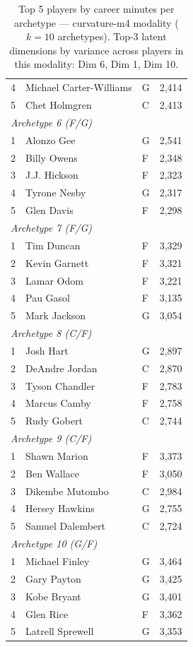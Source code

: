 \begin{table}[htbp]
\begin{tabular}{rlll}
    4 & Michael Carter-Williams & G & 2,414 \\
    5 & Chet Holmgren & C & 2,413 \\
    \midrule[0.4pt]
    \multicolumn{4}{l}{\textit{Archetype 6 (F/G)}} \\
    \midrule
    1 & Alonzo Gee & G & 2,541 \\
    2 & Billy Owens & F & 2,348 \\
    3 & J.J. Hickson & F & 2,323 \\
    4 & Tyrone Nesby & G & 2,317 \\
    5 & Glen Davis & F & 2,298 \\
    \midrule[0.4pt]
    \multicolumn{4}{l}{\textit{Archetype 7 (F/G)}} \\
    \midrule
    1 & Tim Duncan & F & 3,329 \\
    2 & Kevin Garnett & F & 3,321 \\
    3 & Lamar Odom & F & 3,221 \\
    4 & Pau Gasol & F & 3,135 \\
    5 & Mark Jackson & G & 3,054 \\
    \midrule[0.4pt]
    \multicolumn{4}{l}{\textit{Archetype 8 (C/F)}} \\
    \midrule
    1 & Josh Hart & G & 2,897 \\
    2 & DeAndre Jordan & C & 2,870 \\
    3 & Tyson Chandler & F & 2,783 \\
    4 & Marcus Camby & F & 2,758 \\
    5 & Rudy Gobert & C & 2,744 \\
    \midrule[0.4pt]
    \multicolumn{4}{l}{\textit{Archetype 9 (C/F)}} \\
    \midrule
    1 & Shawn Marion & F & 3,373 \\
    2 & Ben Wallace & F & 3,050 \\
    3 & Dikembe Mutombo & C & 2,984 \\
    4 & Hersey Hawkins & G & 2,755 \\
    5 & Samuel Dalembert & C & 2,724 \\
    \midrule[0.4pt]
    \multicolumn{4}{l}{\textit{Archetype 10 (G/F)}} \\
    \midrule
    1 & Michael Finley & G & 3,464 \\
    2 & Gary Payton & G & 3,425 \\
    3 & Kobe Bryant & G & 3,401 \\
    4 & Glen Rice & F & 3,362 \\
    5 & Latrell Sprewell & G & 3,353 \\
    \bottomrule
  \end{tabular}
  \caption{Top 5 players by career minutes per archetype --- curvature-m4 modality ($k=10$ archetypes). Top-3 latent dimensions by variance across players in this modality: Dim 6, Dim 1, Dim 10.}
  \label{tab:arch_reps_curvature_m4}
\end{table}

